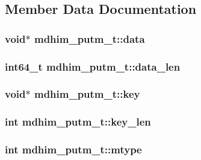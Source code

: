 \subsection{Member Data Documentation}
\hypertarget{structmdhim__putm__t_a37449dce75af49ca87e00bb51a480b37}{
\subsubsection[{data}]{\setlength{\rightskip}{0pt plus 5cm}void$\ast$ mdhim\-\_\-putm\-\_\-t\-::data}}\label{d6/dcd/structmdhim__putm__t_a37449dce75af49ca87e00bb51a480b37}
\hypertarget{structmdhim__putm__t_a91606d5b7d2ef6385d7416abff13bc3c}{
\subsubsection[{data\-\_\-len}]{\setlength{\rightskip}{0pt plus 5cm}int64\-\_\-t mdhim\-\_\-putm\-\_\-t\-::data\-\_\-len}}\label{d6/dcd/structmdhim__putm__t_a91606d5b7d2ef6385d7416abff13bc3c}
\hypertarget{structmdhim__putm__t_a6b5ee783b09f0039b09597e25005396e}{
\subsubsection[{key}]{\setlength{\rightskip}{0pt plus 5cm}void$\ast$ mdhim\-\_\-putm\-\_\-t\-::key}}\label{d6/dcd/structmdhim__putm__t_a6b5ee783b09f0039b09597e25005396e}
\hypertarget{structmdhim__putm__t_afbac7bbcd98d8489c502fbd6599964a0}{
\subsubsection[{key\-\_\-len}]{\setlength{\rightskip}{0pt plus 5cm}int mdhim\-\_\-putm\-\_\-t\-::key\-\_\-len}}\label{d6/dcd/structmdhim__putm__t_afbac7bbcd98d8489c502fbd6599964a0}
\hypertarget{structmdhim__putm__t_a632ccc930561029cfbbb28ec2b9929a4}{
\subsubsection[{mtype}]{\setlength{\rightskip}{0pt plus 5cm}int mdhim\-\_\-putm\-\_\-t\-::mtype}}\label{d6/dcd/structmdhim__putm__t_a632ccc930561029cfbbb28ec2b9929a4}
